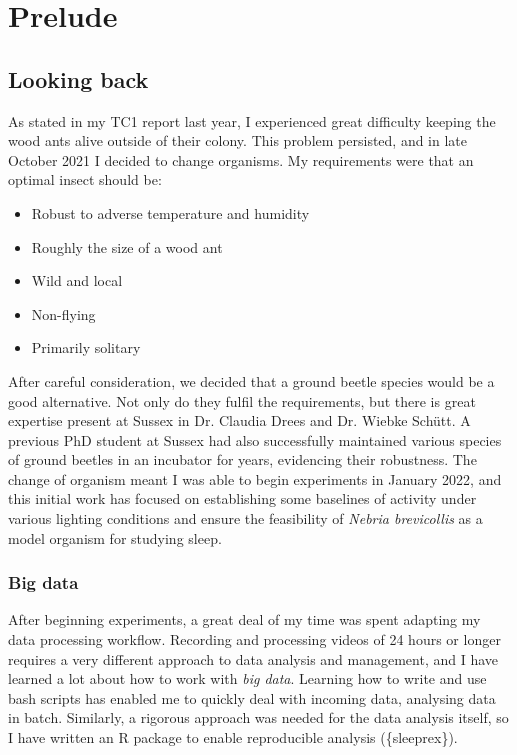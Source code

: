 \section{Prelude} \label{prelude}
\subsection{Looking back}
As stated in my TC1 report last year, I experienced great difficulty keeping the wood ants alive outside of their colony. This problem persisted, and in late October 2021 I decided to change organisms. My requirements were that an optimal insect should be:
\begin{itemize}
    \item Robust to adverse temperature and humidity
    \item Roughly the size of a wood ant
    \item Wild and local
    \item Non-flying
    \item Primarily solitary
\end{itemize} 

After careful consideration, we decided that a ground beetle species would be a good alternative. Not only do they fulfil the requirements, but there is great expertise present at Sussex in Dr. Claudia Drees and Dr. Wiebke Schütt. A previous PhD student at Sussex had also successfully maintained various species of ground beetles in an incubator for years, evidencing their robustness. 
The change of organism meant I was able to begin experiments in January 2022, and this initial work has focused on establishing some baselines of activity under various lighting conditions and ensure the feasibility of \textit{Nebria brevicollis} as a model organism for studying sleep. 

\subsubsection{Big data}
After beginning experiments, a great deal of my time was spent adapting my data processing workflow. Recording and processing videos of 24 hours or longer requires a very different approach to data analysis and management, and I have learned a lot about how to work with \textit{big data}. Learning how to write and use bash scripts has enabled me to quickly deal with incoming data, analysing data in batch. Similarly, a rigorous approach was needed for the data analysis itself, so I have written an R package to enable reproducible analysis (\{sleeprex\}).

